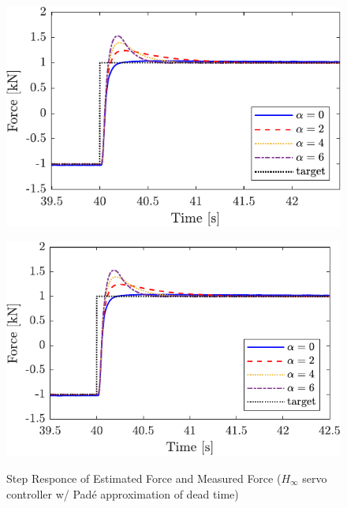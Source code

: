 \begin{figure}[t]
    \begin{minipage}{\minipageratio\hsize}
    \centering
        \includegraphics[keepaspectratio, width = \minifigwidth]{contents/ForceControl/figure/1115/crop-1115_JFPSHinf_estforcepade1_step.pdf}
        \label{fig4:crop-1115_JFPSHinf_estforcepade1_step}
    \end{minipage}
    \begin{minipage}{\minipageratio\hsize}
    \centering
        \includegraphics[keepaspectratio, width = \minifigwidth]{contents/ForceControl/figure/1115/crop-1115_JFPSHinf_forcepade1_step.pdf}
        \label{fig4:crop-1115_JFPSHinf_forcepade1_step}
    \end{minipage}
    \caption{Step Responce of Estimated Force and Measured Force ($H_\infty$ servo controller w/ Pad\'e approximation of dead time)}
    \label{fig4:crop-1115_JFPSHinfpade1_step}
\end{figure}

